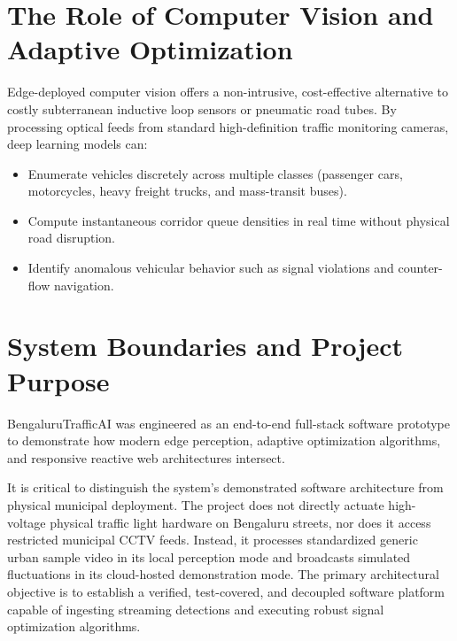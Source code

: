 \section{The Role of Computer Vision and Adaptive Optimization}
Edge-deployed computer vision offers a non-intrusive, cost-effective alternative to costly subterranean inductive loop sensors or pneumatic road tubes. By processing optical feeds from standard high-definition traffic monitoring cameras, deep learning models can:
\begin{itemize}[leftmargin=*]
    \item Enumerate vehicles discretely across multiple classes (passenger cars, motorcycles, heavy freight trucks, and mass-transit buses).
    \item Compute instantaneous corridor queue densities in real time without physical road disruption.
    \item Identify anomalous vehicular behavior such as signal violations and counter-flow navigation.
\end{itemize}

\section{System Boundaries and Project Purpose}
BengaluruTrafficAI was engineered as an end-to-end full-stack software prototype to demonstrate how modern edge perception, adaptive optimization algorithms, and responsive reactive web architectures intersect.

\begin{conceptbox}
It is critical to distinguish the system's demonstrated software architecture from physical municipal deployment. The project does not directly actuate high-voltage physical traffic light hardware on Bengaluru streets, nor does it access restricted municipal CCTV feeds. Instead, it processes standardized generic urban sample video in its local perception mode and broadcasts simulated fluctuations in its cloud-hosted demonstration mode. The primary architectural objective is to establish a verified, test-covered, and decoupled software platform capable of ingesting streaming detections and executing robust signal optimization algorithms.
\end{conceptbox}
